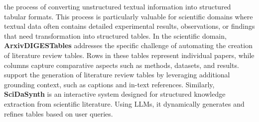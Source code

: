 the process of converting unstructured textual information into structured tabular formats. %
This process is particularly valuable for scientific domains where textual data often contains detailed experimental results, observations, or findings that need transformation into structured tables. 
% 
In the scientific domain, \textbf{ArxivDIGESTables} \citep{newman-etal-2024-arxivdigestables} addresses the specific challenge of automating the creation of literature review tables. Rows in these tables represent individual papers, while columns capture comparative aspects such as methods, datasets, and results. %
support the generation of literature review tables by leveraging additional grounding context, such as captions and in-text references. 
%
\iffalse
Similarly, \textbf{SciDaSynth}   \citep{wang2024scidasynth} is an interactive system designed for structured knowledge extraction from scientific literature. Using %
LLMs, 
it dynamically generates and refines tables based on user queries. %

